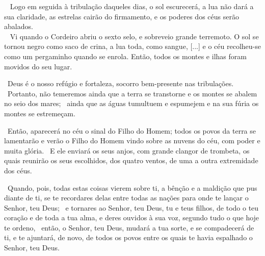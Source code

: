 \documentclass[12pt,aspectratio=169]{beamer}
\newcommand{\ver}[1]{%
    \raisebox{0.50ex}{%
        \scalebox{1.1}{%
            \pmb{\textbf{\textcolor{BSpbg}{#1}}}%
        }%
    }%
}
\newcommand{\QUOTE}[1]{%
    \par\noindent\hspace*{0.1\linewidth}%
    \begin{minipage}{0.8\linewidth}%
        \linespread{1.35}\large{#1}%
    \end{minipage}%
}
\newcommand{\WIDEQUOTE}[1]{%
    \par\noindent\hspace*{0.02\linewidth}%
    \begin{minipage}{0.92\linewidth}%
        \linespread{1.25}\large{#1}%
    \end{minipage}%
}
\newcommand{\RED}[1]{{\textcolor{TXred}{#1}}}
\newcommand{\ORA}[1]{{\textcolor{TXora}{#1}}}
\newcommand{\YEL}[1]{{\textcolor{TXyel}{#1}}}
\newcommand{\GRE}[1]{{\textcolor{TXgre}{#1}}}
\newcommand{\CYA}[1]{{\textcolor{TXcya}{#1}}}
\newcommand{\BLU}[1]{{\textcolor{TXblu}{#1}}}
\newcommand{\MAG}[1]{{\textcolor{TXmag}{#1}}}
\newcommand{\BRI}[1]{{\textcolor{BSpbg}{#1}}}   %
\begin{document}
    \begin{frame}
        \WIDEQUOTE{%
            \ver{(ARA) Mt~24.29}~%
            Logo em seguida à tribulação daqueles dias, o \YEL{sol escurecerá},  a  \RED{lua
            não dará a  sua  claridade},  as  \GRE{estrelas  cairão  do  firmamento},  e  os
            \CYA{poderes dos céus serão abalados}. \\[\bigskipamount]
            \ver{(ARA) Ap~6.12,14}~%
            Vi  quando  o  Cordeiro  abriu  o  \BLU{sexto  selo},  e  sobreveio  \MAG{grande
            terremoto}. O \YEL{sol se tornou negro} como saco de  crina,  a  \RED{lua  toda,
            como sangue}, [...] e o  \CYA{céu  recolheu-se  como  um  pergaminho  quando  se
            enrola}. Então, todos os \MAG{montes e ilhas foram movidos do seu lugar}.
        }
    \end{frame}

    \begin{frame}
        \QUOTE{%
            \ver{(ARA) Sl~46.1}~Deus é o nosso refúgio e fortaleza, socorro bem-presente nas
            \RED{tribulações}. \ver{2}~Portanto, não temeremos ainda  que  a  \ORA{terra  se
            transtorne} e os \YEL{montes se abalem no seio dos mares}; \ver{3}~ainda que  as
            \GRE{águas tumultuem e espumejem} e na sua fúria os \YEL{montes se estremeçam}.
        }
    \end{frame}

    \begin{frame}
        \QUOTE{%
            \ver{(ARA) Mt~24.30}~Então, aparecerá no céu o \YEL{sinal do  Filho  do  Homem};
            todos os povos da terra se lamentarão e  \GRE{verão  o  Filho  do  Homem}  vindo
            \CYA{sobre as nuvens do céu}, com \MAG{poder e  muita  glória}.  \ver{31}~E  ele
            enviará os seus \YEL{anjos}, com grande clangor de trombeta, os  quais  reunirão
            os seus \BLU{es}\BRI{co}\BLU{lhi}\BRI{dos}, dos quatro  ventos,  \GRE{de  uma  a
            outra extremidade dos céus}.
        }
    \end{frame}

    \begin{frame}
        \WIDEQUOTE{%
            \ver{(ARA) Dt~30.1}~Quando, pois, todas estas coisas vierem sobre ti, a bênção e
            a maldição que pus diante de ti, se te  recordares  delas  entre  \GRE{todas  as
            nações} para onde te lançar o Senhor, teu Deus; \ver{2}~e  tornares  ao  Senhor,
            teu Deus, tu e teus filhos, de todo o teu coração e de toda a tua alma, e  deres
            ouvidos à sua voz, segundo tudo o que hoje te ordeno, \ver{3}~então,  o  Senhor,
            teu Deus, \MAG{mudará  a  tua  sorte},  e  se  \MAG{compadecerá  de  ti},  e  te
            \ORA{ajuntará}, de novo, de todos os povos entre os quais te havia  espalhado  o
            Senhor, teu Deus.
        }
    \end{frame}
\end{document}
